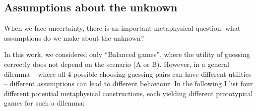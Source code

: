 \documentclass{article}
\theoremstyle{definition}
\begin{document}
\subsection{Assumptions about the unknown}

When we face uncertainty, there is an important metaphysical question: what assumptions do we make about the unknown?

In this work, we considered only ``Balanced games'', where the utility of guessing correctly does not depend on the scenario (A or B).
However, in a general dilemma -- where all 4 possible choosing-guessing pairs can have different utilities -- different assumptions can lead to different behaviour. In the following I list four different potential metaphysical constructions, each yielding different prototypical games for such a dilemma:
\end{document}
